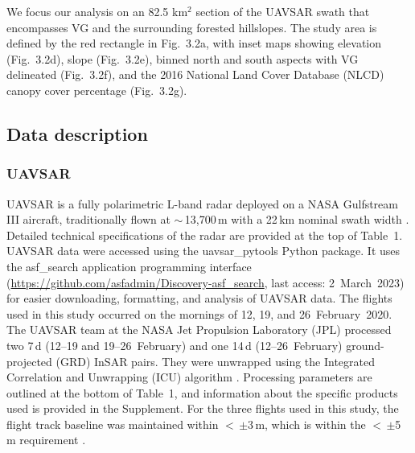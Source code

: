 We focus our analysis on an 82.5 km$^{2}$ section of the UAVSAR swath that encompasses VG and the surrounding forested hillslopes. The study area is defined by the red rectangle in Fig.~3.2a, with inset maps showing elevation (Fig.~3.2d), slope (Fig.~3.2e), binned north and south aspects with VG delineated (Fig.~3.2f), and the 2016 National Land Cover Database (NLCD) canopy cover percentage (Fig.~3.2g).

\hypertarget{ch3-methods-4}{\subsection{Data description}\label{ch3-methods-4}}
\hypertarget{ch3-methods-5}{\subsubsection{UAVSAR}\label{ch3-methods-5}}


UAVSAR is a fully polarimetric L-band radar deployed on a NASA Gulfstream III aircraft, traditionally flown at $\sim$\,13,700\,m with a 22\,km nominal swath width \citep{hensleyUAVSARInstrumentDescription2008, rosenUAVSARNewNASA2006}. Detailed technical specifications of the radar are provided at the top of Table~1. UAVSAR data were accessed using the uavsar\_pytools \citep{keskinenUavsarPytools2022} Python package. It uses the asf\_search application programming interface (\url{https://github.com/asfadmin/Discovery-asf_search}, last access: 2~March~2023) for easier downloading, formatting, and analysis of UAVSAR data. The flights used in this study occurred on the mornings of 12, 19, and 26~February~2020. The UAVSAR team at the NASA Jet Propulsion Laboratory (JPL) processed two 7\,d (12--19 and 19--26~February) and one 14\,d (12--26~February) ground-projected (GRD) InSAR pairs. They were unwrapped using the Integrated Correlation and Unwrapping (ICU) algorithm \citep{goldsteinSatelliteRadarInterferometry1988}. Processing parameters are outlined at the bottom of Table~1, and information about the specific products used is provided in the Supplement. For the three flights used in this study, the flight track baseline was maintained within $<$\,$\pm$3\,m, which is within the $<$\,$\pm$5\,m requirement \citep{hensleyUAVSARInstrumentDescription2008}.

